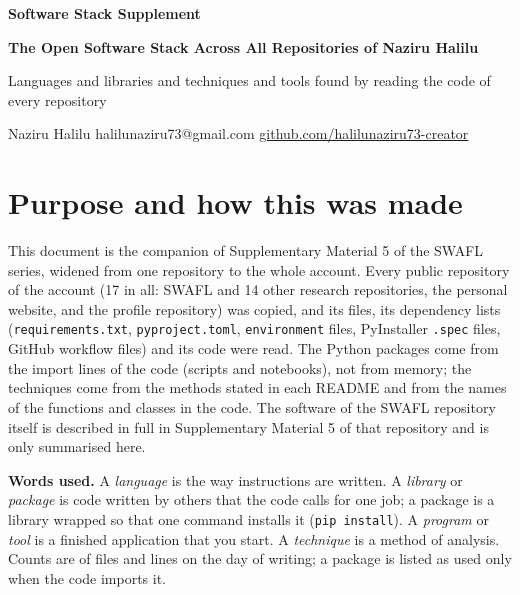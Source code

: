 \documentclass[11pt,a4paper]{article}
\begin{document}
\begin{center}{\large\bfseries\sffamily Software Stack Supplement\par}\vspace{4pt}
{\LARGE\bfseries\sffamily The Open Software Stack Across All Repositories of Naziru Halilu\par}\vspace{6pt}
{\normalsize Languages and libraries and techniques and tools found by reading the code of every repository\par}\vspace{6pt}
{\small Naziru Halilu \quad halilunaziru73@gmail.com \quad \href{https://github.com/halilunaziru73-creator}{github.com/halilunaziru73-creator}\par}\end{center}
\tableofcontents
\clearpage

\section{Purpose and how this was made}
This document is the companion of Supplementary Material 5 of the SWAFL series, widened from one repository to the whole account. Every public repository of the account (17 in all: SWAFL and 14 other research repositories, the personal website, and the profile repository) was copied, and its files, its dependency lists (\texttt{requirements.txt}, \texttt{pyproject.toml}, \texttt{environment} files, PyInstaller \texttt{.spec} files, GitHub workflow files) and its code were read. The Python packages come from the import lines of the code (scripts and notebooks), not from memory; the techniques come from the methods stated in each README and from the names of the functions and classes in the code. The software of the SWAFL repository itself is described in full in Supplementary Material 5 of that repository and is only summarised here.

\textbf{Words used.} A \emph{language} is the way instructions are written. A \emph{library} or \emph{package} is code written by others that the code calls for one job; a package is a library wrapped so that one command installs it (\texttt{pip install}). A \emph{program} or \emph{tool} is a finished application that you start. A \emph{technique} is a method of analysis. Counts are of files and lines on the day of writing; a package is listed as used only when the code imports it.
\end{document}
